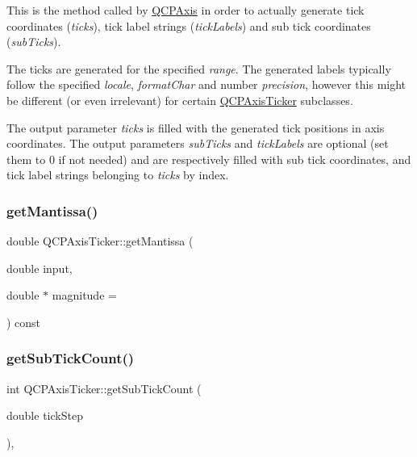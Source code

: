 This is the method called by \mbox{\hyperlink{class_q_c_p_axis}{Q\+C\+P\+Axis}} in order to actually generate tick coordinates ({\itshape ticks}), tick label strings ({\itshape tick\+Labels}) and sub tick coordinates ({\itshape sub\+Ticks}).

The ticks are generated for the specified {\itshape range}. The generated labels typically follow the specified {\itshape locale}, {\itshape format\+Char} and number {\itshape precision}, however this might be different (or even irrelevant) for certain \mbox{\hyperlink{class_q_c_p_axis_ticker}{Q\+C\+P\+Axis\+Ticker}} subclasses.

The output parameter {\itshape ticks} is filled with the generated tick positions in axis coordinates. The output parameters {\itshape sub\+Ticks} and {\itshape tick\+Labels} are optional (set them to 0 if not needed) and are respectively filled with sub tick coordinates, and tick label strings belonging to {\itshape ticks} by index. \mbox{\label{class_q_c_p_axis_ticker_a2f1e223bafbf2cec7c3ba8b08d5c77e8}} 
\subsubsection{\texorpdfstring{getMantissa()}{getMantissa()}}
{\footnotesize\ttfamily double Q\+C\+P\+Axis\+Ticker\+::get\+Mantissa (\begin{DoxyParamCaption}\item[{double}]{input,  }\item[{double $\ast$}]{magnitude = {} }\end{DoxyParamCaption}) const\hspace{0.3cm}{\ttfamily [protected]}}

\mbox{\label{class_q_c_p_axis_ticker_a4ccc403ced7a1457ce6ba293509933c8}} 
\subsubsection{\texorpdfstring{getSubTickCount()}{getSubTickCount()}}
{\footnotesize\ttfamily int Q\+C\+P\+Axis\+Ticker\+::get\+Sub\+Tick\+Count (\begin{DoxyParamCaption}\item[{double}]{tick\+Step }\end{DoxyParamCaption})\hspace{0.3cm}{\ttfamily [protected]}, {\ttfamily [virtual]}}



